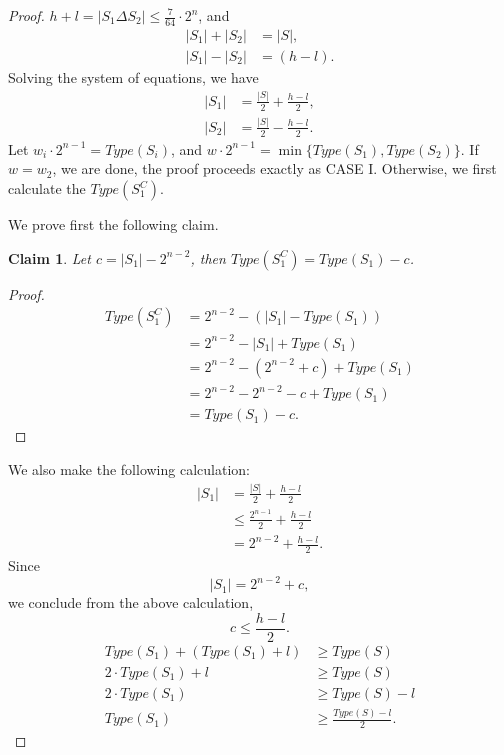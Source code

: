 \documentclass[12pt]{ucthesis}
\theoremstyle{plain}
\newtheorem{claim}{Claim}
\theoremstyle{definition}
\begin{document}
\begin{proof}
$h + l = |S_1 \Delta S_2| \le \frac{7}{64} \cdot 2^n$, and
\begin{align*}
|S_1| + |S_2| & = |S|, \\
|S_1| - |S_2| & = (h - l).
\end{align*}
Solving the system of equations, we have
\begin{align*}
|S_1| & = \frac{|S|}{2} + \frac{h - l}{2}, \\
|S_2| & = \frac{|S|}{2} - \frac{h - l}{2}.
\end{align*}
Let $w_i \cdot 2^{n - 1} = Type(S_i)$,
and $w \cdot 2^{n - 1} = \min\{Type(S_1), Type(S_2)\}$.
If $w = w_2$, we are done, the proof proceeds exactly as CASE I.
Otherwise, we first calculate the $Type(S_1^C)$.

We prove first the following claim.
\begin{claim}
\label{Claim 7}
Let $c = |S_1| - 2^{n - 2}$, then $Type(S_1^C) = Type(S_1) - c$.
\end{claim}
\begin{proof}
\begin{align*}
Type(S_1^C)
& = 2^{n - 2} - (|S_1| - Type(S_1)) \\
& = 2^{n - 2} - |S_1| + Type(S_1) \\
& = 2^{n - 2} - (2^{n - 2} + c) + Type(S_1) \\
& = 2^{n - 2} - 2^{n - 2} - c + Type(S_1) \\
& = Type(S_1) - c.
\end{align*}
\end{proof}

We also make the following calculation:
\begin{align*}
|S_1| & = \frac{|S|}{2} + \frac{h - l}{2} \\
      & \le \frac{2^{n - 1}}{2} + \frac{h - l}{2} \\
      & = 2^{n - 2} + \frac{h - l}{2}.
\end{align*}
Since
\begin{equation*}
|S_1| = 2^{n - 2} + c,
\end{equation*}
we conclude from the above calculation,
\begin{equation*}
c \le \frac{h - l}{2}.
\end{equation*}
\begin{align*}
Type(S_1) + (Type(S_1) + l) & \ge Type(S) \\
      2 \cdot Type(S_1) + l & \ge Type(S) \\
	  2 \cdot Type(S_1) & \ge Type(S) - l \\
		  Type(S_1) & \ge \frac{Type(S) - l}{2}.
\end{align*}


\end{proof}
\end{document}
